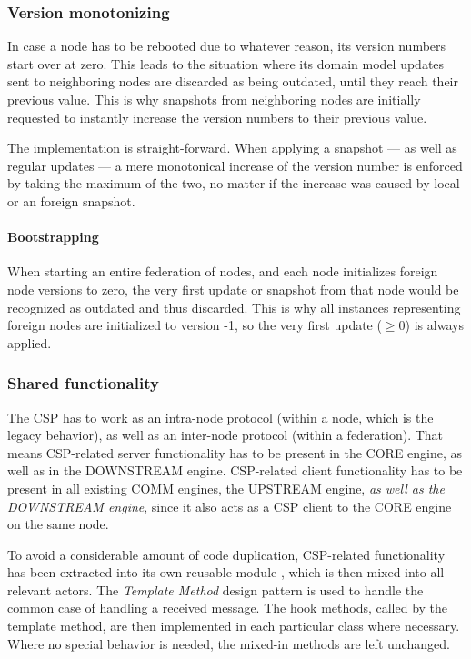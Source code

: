 

\subsubsection{Version monotonizing}
In case a node has to be rebooted due to whatever reason, its version numbers
start over at zero.
This leads to the situation where its domain model updates sent to neighboring
nodes are discarded as being outdated, until they reach their previous value.
This is why snapshots from neighboring nodes are initially requested to
instantly increase the version numbers to their previous value.

The implementation is straight-forward. When applying a snapshot --- as well as regular
updates --- a mere monotonical increase of the version number is enforced by
taking the maximum of the two, no matter if the increase was caused by local or
an foreign snapshot.

\paragraph{Bootstrapping}
When starting an entire federation of nodes, and each node initializes foreign
node versions to zero, the very first update or snapshot from that node would
be recognized as outdated and thus discarded. This is why all
 instances representing foreign nodes are
initialized to version -1, so the very first update ($\geqslant 0$) is always
applied.

\subsubsection{Shared functionality}
The \gls{CSP} has to work as an intra-node protocol (within a node, which is
the legacy behavior), as well as an inter-node protocol (within a federation).
That means \gls{CSP}-related server functionality has to be present in the CORE
engine, as well as in the DOWNSTREAM engine. CSP-related client functionality has
to be present in all existing COMM engines, the UPSTREAM engine, \emph{as well
as the DOWNSTREAM engine}, since it also acts as a CSP client to the CORE engine on
the same node.

To avoid a considerable amount of code duplication, CSP-related functionality
has been extracted into its own reusable module , which is then mixed into all
relevant actors. The \emph{Template Method} design pattern is used to handle
the common case of handling a received
 message. The hook methods,
called by the template method, are then implemented
in each particular class where necessary. Where no special behavior is needed,
the mixed-in methods are left unchanged.

